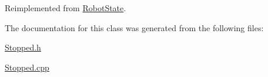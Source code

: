 Reimplemented from \mbox{\hyperlink{class_robot_state_a58fdf53d3f27201879d4dbf7aaef7ca1}{Robot\+State}}.



The documentation for this class was generated from the following files\+:\begin{DoxyCompactItemize}
\item 
\mbox{\hyperlink{_stopped_8h}{Stopped.\+h}}\item 
\mbox{\hyperlink{_stopped_8cpp}{Stopped.\+cpp}}\end{DoxyCompactItemize}
